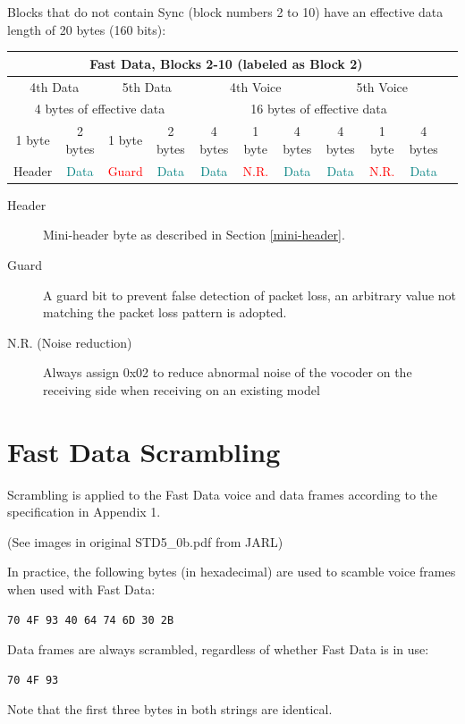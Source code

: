 \documentclass[10pt]{report}
\begin{document}
Blocks that do not contain Sync (block numbers 2 to 10) have an
effective data length of 20 bytes (160 bits):

\small{}
\begin{tabular}{|c|c|c|c|c|c|c|c|c|c|c|}
  \hline
  \multicolumn{10}{|c|}{\textbf{Fast Data, Blocks 2-10 (labeled as Block 2)}} \\
  \hline
  \multicolumn{2}{|c|}{4th Data} &
  \multicolumn{2}{|c|}{5th Data} &
  \multicolumn{3}{|c|}{4th Voice} &
  \multicolumn{3}{|c|}{5th Voice} \\
  \hline
  \multicolumn{4}{|c|}{4 bytes of effective data} &
  \multicolumn{6}{|c|}{16 bytes of effective data} \\
  \hline
  1 byte & 2 bytes &
  1 byte & 2 bytes &
  4 bytes & 1 byte & 4 bytes &
  4 bytes & 1 byte & 4 bytes \\
  \hline
  Header & \textcolor{teal}{Data} &
  \textcolor{red}{Guard} & \textcolor{teal}{Data} &
  \textcolor{teal}{Data} & \textcolor{red}{N.R.} & \textcolor{teal}{Data} &
  \textcolor{teal}{Data} & \textcolor{red}{N.R.} & \textcolor{teal}{Data} \\
  \hline
\end{tabular}
\normalsize{}

\small{}
\begin{description}
\item[Header] Mini-header byte as described in Section \ref{mini-header}.
\item[Guard] A guard bit to prevent false detection of packet loss,
  an arbitrary value not matching the packet loss pattern is
  adopted.
\item[N.R. (Noise reduction)] Always assign 0x02 to reduce abnormal
  noise of the vocoder on the receiving side when receiving on an
  existing model
\end{description}
\normalsize{}

\section{Fast Data Scrambling}

Scrambling is applied to the Fast Data voice and data frames according
to the specification in Appendix 1.

(See images in original STD5\_0b.pdf from JARL)

In practice, the following bytes (in hexadecimal) are used to scamble
voice frames when used with Fast Data:
\begin{verbatim}
70 4F 93 40 64 74 6D 30 2B
\end{verbatim}
Data frames are always scrambled, regardless of whether Fast Data is in use:
\begin{verbatim}
70 4F 93
\end{verbatim}
Note that the first three bytes in both strings are identical.
\end{document}
